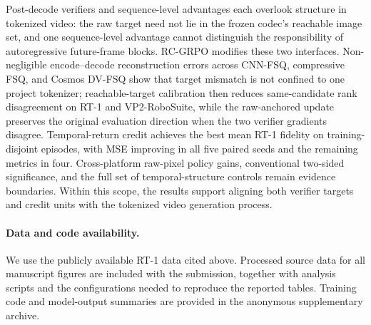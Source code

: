 \documentclass[letterpaper]{article} %
\begin{document}
Post-decode verifiers and sequence-level advantages each overlook structure in tokenized video: the raw target need not lie in the frozen codec's reachable image set, and one sequence-level advantage cannot distinguish the responsibility of autoregressive future-frame blocks. RC-GRPO modifies these two interfaces. Non-negligible encode--decode reconstruction errors across CNN-FSQ, compressive FSQ, and Cosmos DV-FSQ show that target mismatch is not confined to one project tokenizer; reachable-target calibration then reduces same-candidate rank disagreement on RT-1 and VP2-RoboSuite, while the raw-anchored update preserves the original evaluation direction when the two verifier gradients disagree. Temporal-return credit achieves the best mean RT-1 fidelity on training-disjoint episodes, with MSE improving in all five paired seeds and the remaining metrics in four. Cross-platform raw-pixel policy gains, conventional two-sided significance, and the full set of temporal-structure controls remain evidence boundaries. Within this scope, the results support aligning both verifier targets and credit units with the tokenized video generation process.

\paragraph{Data and code availability.}
We use the publicly available RT-1 data cited above. Processed source data for all manuscript figures are included with the submission, together with analysis scripts and the configurations needed to reproduce the reported tables. Training code and model-output summaries are provided in the anonymous supplementary archive.



% 
\end{document}

